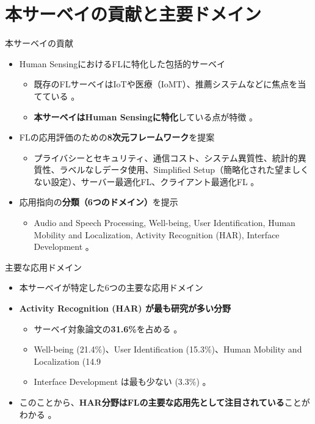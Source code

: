 \documentclass[unicode,12pt,aspectratio=169,dvipdfmx]{beamer}
\begin{document}
\section{本サーベイの貢献と主要ドメイン}
\begin{frame}{本サーベイの貢献}
    \begin{itemize}
        \item Human SensingにおけるFLに特化した包括的サーベイ
        \begin{itemize}
            \item 既存のFLサーベイはIoTや医療（IoMT）、推薦システムなどに焦点を当てている \cite{Source62, Source64}。
            \item \textbf{本サーベイはHuman Sensingに特化}している点が特徴 \cite{Source64}。
        \end{itemize}
        \item FLの応用評価のための\textbf{8次元フレームワーク}を提案 \cite{Source56, Source57}
        \begin{itemize}
            \item プライバシーとセキュリティ、通信コスト、システム異質性、統計的異質性、ラベルなしデータ使用、Simplified Setup（簡略化された望ましくない設定）、サーバー最適化FL、クライアント最適化FL \cite{Source56, Source57}。
        \end{itemize}
        \item 応用指向の\textbf{分類（6つのドメイン）}を提示 \cite{Source57, Source61}
        \begin{itemize}
            \item Audio and Speech Processing, Well-being, User Identification, Human Mobility and Localization, Activity Recognition (HAR), Interface Development \cite{Source57, Source61}。
        \end{itemize}
    \end{itemize}
\end{frame}

\begin{frame}{主要な応用ドメイン}
    \begin{itemize}
        \item 本サーベイが特定した6つの主要な応用ドメイン \cite{Source57, Source61}
        \item \textbf{Activity Recognition (HAR) が最も研究が多い分野}
        \begin{itemize}
            \item サーベイ対象論文の\textbf{31.6\%}を占める \cite{Source101}。
            \item Well-being (21.4\%)、User Identification (15.3\%)、Human Mobility and Localization (14.9%
            \item Interface Development は最も少ない (3.3\%) \cite{Source100, Source101}。
        \end{itemize}
        \item このことから、\textbf{HAR分野はFLの主要な応用先として注目されている}ことがわかる \cite{Source101}。
    \end{itemize}
\end{frame}
\end{document}

